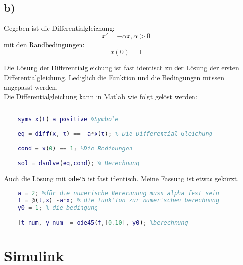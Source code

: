 \documentclass{scrartcl}
\begin{document}
\subsection*{b)}
Gegeben ist die Differentialgleichung:
\begin{equation*}
    x'=-\alpha x,  \alpha>0
\end{equation*}
mit den Randbedingungen:
\begin{equation*}
    x(0)=1
\end{equation*}

Die Lösung der Differentialgleichung ist fast identisch zu der Lösung der ersten Differentialgleichung. Lediglich die Funktion und die Bedingungen müssen angepasst werden.\\
Die Differentialgleichung kann in Matlab wie folgt gelöst werden:
\begin{lstlisting}[language=Matlab, caption=Symbolic Math]
    % Symbolic Math:

    syms x(t) a positive %Symbole
    
    eq = diff(x, t) == -a*x(t); % Die Differential Gleichung
    
    cond = x(0) == 1; %Die Bedinungen
    
    sol = dsolve(eq,cond); % Berechnung
\end{lstlisting}

Auch die Lösung mit \texttt{ode45} ist fast identisch. Meine Fassung ist etwas gekürzt.\\
\begin{lstlisting}[language=Matlab, caption=Numeric Math]
    %Numeric Math:
    a = 2; %für die numerische Berechnung muss alpha fest sein
    f = @(t,x) -a*x; % die funktion zur numerischen berechnung
    y0 = 1; % die bedingung

    [t_num, y_num] = ode45(f,[0,10], y0); %berechnung
\end{lstlisting}

\section*{Simulink}
\end{document}
